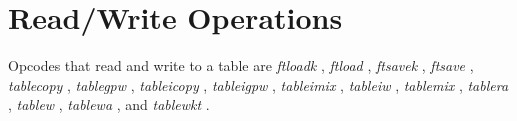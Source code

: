 \begin{comment}
\documentclass[10pt]{article}
\usepackage{fullpage, graphicx, url}
\setlength{\parskip}{1ex}
\setlength{\parindent}{0ex}
\title{Read/Write Operations}



\begin{tabular}{ccc}
The Alternative Csound Reference Manual & & \\
Previous &Function Table Control &Next

\end{tabular}

\end{comment}
\section{Read/Write Operations}


  Opcodes that read and write to a table are \emph{ftloadk}
, \emph{ftload}
, \emph{ftsavek}
, \emph{ftsave}
, \emph{tablecopy}
, \emph{tablegpw}
, \emph{tableicopy}
, \emph{tableigpw}
, \emph{tableimix}
, \emph{tableiw}
, \emph{tablemix}
, \emph{tablera}
, \emph{tablew}
, \emph{tablewa}
, and \emph{tablewkt}
. 


\begin{comment}
\begin{tabular}{lcr}
Previous &Home &Next \\
Function Table Control &Up &Table Selection

\end{tabular}



\end{comment}
